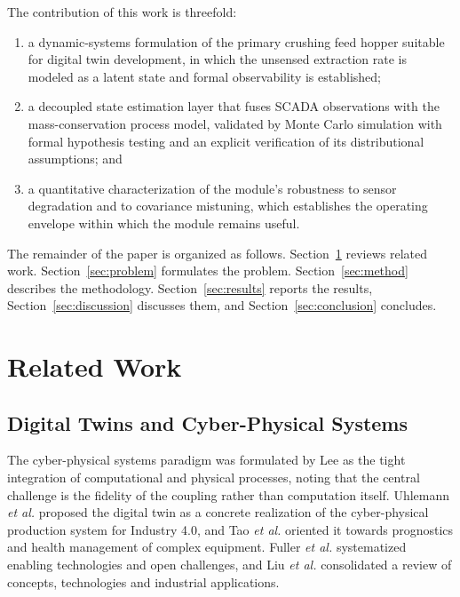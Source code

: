 \documentclass[conference]{IEEEtran}
\begin{document}
The contribution of this work is threefold:

\begin{enumerate}
\item a dynamic-systems formulation of the primary crushing feed hopper suitable
      for digital twin development, in which the unsensed extraction rate is
      modeled as a latent state and formal observability is established;
\item a decoupled state estimation layer that fuses SCADA observations with the
      mass-conservation process model, validated by Monte Carlo simulation with
      formal hypothesis testing and an explicit verification of its
      distributional assumptions; and
\item a quantitative characterization of the module's robustness to sensor
      degradation and to covariance mistuning, which establishes the operating
      envelope within which the module remains useful.
\end{enumerate}

The remainder of the paper is organized as follows. Section~\ref{sec:related}
reviews related work. Section~\ref{sec:problem} formulates the problem.
Section~\ref{sec:method} describes the methodology. Section~\ref{sec:results}
reports the results, Section~\ref{sec:discussion} discusses them, and
Section~\ref{sec:conclusion} concludes.

\section{Related Work}
\label{sec:related}

\subsection{Digital Twins and Cyber-Physical Systems}

The cyber-physical systems paradigm was formulated by Lee \cite{lee2008} as the
tight integration of computational and physical processes, noting that the
central challenge is the fidelity of the coupling rather than computation
itself. Uhlemann \textit{et al.} \cite{uhlemann2017} proposed the digital twin
as a concrete realization of the cyber-physical production system for Industry
4.0, and Tao \textit{et al.} \cite{tao2019} oriented it towards prognostics and
health management of complex equipment. Fuller \textit{et al.}
\cite{fuller2020} systematized enabling technologies and open challenges, and
Liu \textit{et al.} \cite{liu2021} consolidated a review of concepts,
technologies and industrial applications.
\end{document}
